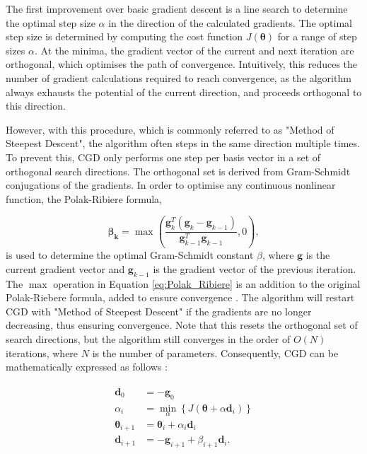 The first improvement over basic gradient descent is a line search to determine the optimal step size $\alpha$ in the direction of the calculated gradients.
The optimal step size is determined by computing the cost function $J(\bm{\theta})$ for a range of step sizes $\alpha$.
At the minima, the gradient vector of the current and next iteration are orthogonal, which optimises the path of convergence.  %
Intuitively, this reduces the number of gradient calculations required to reach convergence, as the algorithm always exhausts the potential of the current direction, and proceeds orthogonal to this direction.

However, with this procedure, which is commonly referred to as "Method of Steepest Descent", the algorithm often steps in the same direction multiple times.
To prevent this, CGD only performs one step per basis vector in a set of orthogonal search directions.
The orthogonal set is derived from Gram-Schmidt conjugations of the gradients.
In order to optimise any continuous nonlinear function, the Polak-Ribiere formula,

\begin{equation}\label{eq:Polak_Ribiere}
    \bm{\beta_{k}} = \max{ \left( \frac{\bm{g}^T_{k}(\bm{g}_{k} - \bm{g}_{k-1})}{\bm{g}^T_{k-1} \bm{g}_{k-1}}, 0 \right) },
\end{equation}
\noindent
is used to determine the optimal Gram-Schmidt constant $\beta$,
where $\bm{g}$ is the current gradient vector and $\bm{g}_{k-1}$ is the gradient vector of the previous iteration.
The $\max$ operation in Equation \eqref{eq:Polak_Ribiere} is an addition to the original Polak-Riebere formula, added to ensure convergence \cite{shewchuk1994introduction}.
The algorithm will restart CGD with "Method of Steepest Descent" if the gradients are no longer decreasing, thus ensuring convergence.
Note that this resets the orthogonal set of search directions, but the algorithm still converges in the order of $O(N)$ iterations, where $N$ is the number of parameters.
Consequently, CGD can be mathematically expressed as follows \cite{shewchuk1994introduction}:


\begin{align}\label{eq:CGD}
    \begin{split}
        \bm{d}_{0}        & = - \bm{g}_{0}                                                    \\
        \alpha_{i}        & = \min_{\alpha} \left\{  J\left(\bm{\theta} + \alpha \bm{d}_{i} \right) \right\} \\
        \bm{\theta}_{i+1} & = \bm{\theta}_{i} + \alpha_{i} \bm{d}_{i}                         \\
        \bm{d}_{i+1}      & = -\bm{g}_{i+1} + \beta_{i+1} \bm{d}_{i}.                          \\
    \end{split}
\end{align}

